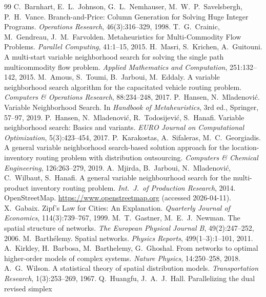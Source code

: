 \documentclass[runningheads]{llncs}
\begin{document}
\FloatBarrier
\begin{thebibliography}{99}
\small
{} C.~Barnhart, E.~L.~Johnson, G.~L.~Nemhauser,
M.~W.~P.~Savelsbergh, P.~H.~Vance. Branch-and-Price: Column Generation for
Solving Huge Integer Programs. \textit{Operations Research}, 46(3):316--329,
1998.
 T.~G.~Crainic, M.~Gendreau, J.~M.~Farvolden.
Metaheuristics for Multi-Commodity Flow Problems. \textit{Parallel Computing},
41:1--15, 2015.
 H.~Masri, S.~Krichen, A.~Guitouni. A multi-start variable
neighborhood search for solving the single path multicommodity flow problem.
\textit{Applied Mathematics and Computation}, 251:132--142, 2015.
 M.~Amous, S.~Toumi, B.~Jarboui, M.~Eddaly. A variable
neighborhood search algorithm for the capacitated vehicle routing problem.
\textit{Computers \& Operations Research}, 88:234--248, 2017.
 P.~Hansen, N.~Mladenovi\'c. Variable Neighborhood Search.
In \textit{Handbook of Metaheuristics}, 3rd ed., Springer, 57--97, 2019.
 P.~Hansen, N.~Mladenovi\'c, R.~Todosijevi\'c, S.~Hanafi.
Variable neighborhood search: Basics and variants. \textit{EURO Journal on
Computational Optimization}, 5(3):423--454, 2017.
 P.~Karakostas, A.~Sifaleras, M.~C.~Georgiadis. A
general variable neighborhood search-based solution approach for the
location-inventory routing problem with distribution outsourcing.
\textit{Computers \& Chemical Engineering}, 126:263--279, 2019.
 A.~Mjirda, B.~Jarboui, N.~Mladenovi\'c, C.~Wilbaut,
S.~Hanafi. A general variable neighbourhood search for the multi-product
inventory routing problem. \textit{Int.\ J.\ of Production Research}, 2014.
 OpenStreetMap. \url{https://www.openstreetmap.org} (accessed
2026-04-11).
 X.~Gabaix. Zipf's Law for Cities: An Explanation.
\textit{Quarterly Journal of Economics}, 114(3):739--767, 1999.
 M.~T.~Gastner, M.~E.~J.~Newman. The spatial structure of
networks. \textit{The European Physical Journal B}, 49(2):247--252, 2006.
 M.~Barth\'elemy. Spatial networks. \textit{Physics
Reports}, 499(1--3):1--101, 2011.
 A.~Kirkley, H.~Barbosa, M.~Barthelemy, G.~Ghoshal. From
networks to optimal higher-order models of complex systems. \textit{Nature
Physics}, 14:250--258, 2018.
 A.~G.~Wilson. A statistical theory of spatial distribution
models. \textit{Transportation Research}, 1(3):253--269, 1967.
 Q.~Huangfu, J.~A.~J.~Hall. Parallelizing the dual revised simplex

\end{thebibliography}
\end{document}
